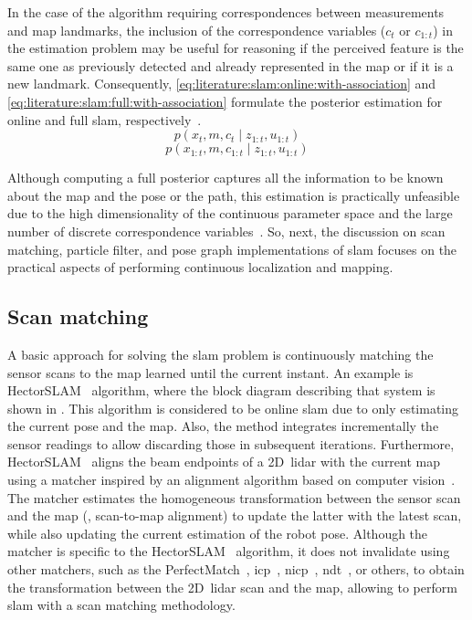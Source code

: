 In the case of the algorithm requiring correspondences
between measurements and map landmarks,
the inclusion of the correspondence variables ($c_t$ or $c_{1:t}$)
in the estimation problem may be useful for reasoning
if the perceived feature is the same one as previously detected
and already represented in the map or if it is a new landmark.
Consequently, \eqref{eq:literature:slam:online:with-association} and
\eqref{eq:literature:slam:full:with-association} formulate
the posterior estimation for online and full \gls{slam},
respectively~\cite{thrun:book:2005}.
\begin{equation}\label{eq:literature:slam:online:with-association}
p\left(x_t,m,c_t \;\vert\; z_{1:t},u_{1:t}\right)
\end{equation}
\begin{equation}\label{eq:literature:slam:full:with-association}
p\left(x_{1:t},m,c_{1:t} \;\vert\; z_{1:t},u_{1:t}\right)
\end{equation}

Although computing a full posterior captures all the information
to be known about the map and the pose or the path,
this estimation is practically unfeasible due to
the high dimensionality of the continuous parameter space
and the large number of discrete correspondence
variables~\cite{thrun:book:2005}.
So, next, the discussion on scan matching, particle filter,
and pose graph implementations of \gls{slam} focuses on
the practical aspects of performing continuous localization and mapping.

\subsection{Scan matching}\label{sec:literature:slam:matching}

A basic approach for solving the \gls{slam} problem is continuously
matching the sensor scans to the map learned until the current instant.
An example is HectorSLAM~\cite{kohlbrecher:ssr:2011} algorithm, where the
block diagram describing that system is shown in
.
This algorithm is considered to be online \gls{slam} due to
only estimating the current pose and the map.
Also, the method integrates incrementally the sensor readings
to allow discarding those in subsequent iterations.
Furthermore, HectorSLAM~\cite{kohlbrecher:ssr:2011} aligns the beam endpoints
of a 2D~\gls{lidar} with the current map using a matcher inspired by an
alignment algorithm based on computer
vision~\cite{lucas-kanade:ijcai:1981}.
The matcher estimates the homogeneous transformation between
the sensor scan and the map (\ie, scan-to-map alignment) to update the latter
with the latest scan, while also updating
the current estimation of the robot pose.
Although the matcher is specific to the HectorSLAM~\cite{kohlbrecher:ssr:2011}
algorithm, it does not invalidate using other matchers,
such as the PerfectMatch~\cite{lauer:robocup:2006},
\gls{icp}~\cite{besl-mckay:tpami:1992},
\gls{nicp}~\cite{serafin-grisetti:iros:2015},
\gls{ndt}~\cite{biber-strasser:iros:2003}, or others,
to obtain the transformation between the 2D~\gls{lidar} scan and the map,
allowing to perform \gls{slam} with a scan matching methodology.

